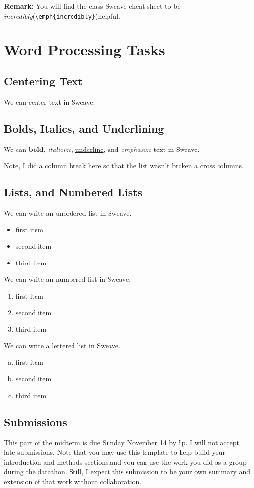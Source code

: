 \documentclass{article}\usepackage[]{graphicx}\usepackage[]{xcolor}
\begin{document}
\begin{multicols}{2}
 \textbf{Remark:} You will find the class Sweave cheat sheet to be
 \emph{incredibly}(\verb|\emph{incredibly}|)helpful.

\section{Word Processing Tasks}

\subsection{Centering Text}

\begin{center}
 We can center text in Sweave.
\end{center}

\subsection{Bolds, Italics, and Underlining}
 We can \textbf{bold}, \textit{italicize}, \underline{underline}, and \emph{emphasize} text in Sweave. 
 
 Note, I did a column break here so that the list wasn’t
 broken a cross columns.
\columnbreak

\subsection{Lists, and Numbered Lists}
 We can write an unordered list in Sweave.
 \begin{itemize}\itemsep0em
\item first item
\item second item
\item third item
\end{itemize}
 We can write an numbered list in Sweave.
 \begin{enumerate}[1.]\itemsep0em
\item first item
\item second item
\item third item
\end{enumerate}
 We can write a lettered list in Sweave.
\begin{enumerate}[a.]\itemsep0em
\item first item
\item second item
\item third item
\end{enumerate}

\subsection{Submissions}
 This part of the midterm is due Sunday November 14 by 5p.
 I will not accept late submissions. Note that you may use
 this template to help build your introduction and methods
 sections,and you can use the work you did as a group during
 the datathon. Still, I expect this submission to be your own
 summary and extension of that work without collaboration.


\end{multicols}
\end{document}
